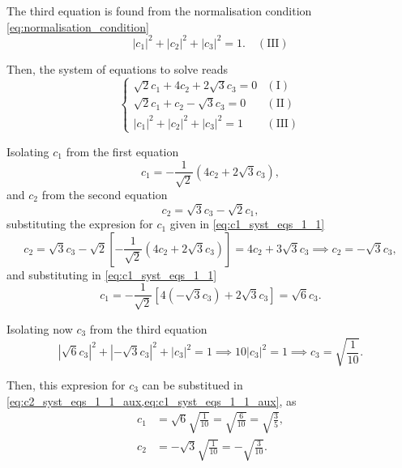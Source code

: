 The third equation is found from the normalisation condition \cref{eq:normalisation_condition} 
\begin{equation}
    \left| c_1 \right|^2 + \left| c_2 \right|^2 + \left| c_3 \right|^2 = 1.
    \quad \left( \mathrm{III} \right)
\end{equation}

Then, the system of equations to solve reads 
\begin{equation}
    \begin{cases}
        \sqrt{2} c_1 + 4 c_2 + 2\sqrt{3} c_3 = 0 & \left( \mathrm{I}   \right) \\
        \sqrt{2} c_1 + c_2 - \sqrt{3} c_3 = 0     & \left( \mathrm{II}  \right) \\
        \left| c_1 \right|^2 + \left| c_2 \right|^2 + \left| c_3 \right|^2 = 1      & \left( \mathrm{III} \right)   
    \end{cases}
\end{equation}

Isolating $c_1$ from the first equation 
\begin{equation}\label{eq:c1_syst_eqs_1_1}
    c_1 = -\frac{1}{\sqrt{2}} \left( 4c_2 + 2 \sqrt{3} c_3 \right),
\end{equation}
and $c_2$ from the second equation 
\begin{equation}
    c_2 = \sqrt{3} c_3 - \sqrt{2} c_1,
\end{equation}
substituting the expresion for $c_1$ given in \cref{eq:c1_syst_eqs_1_1}
\begin{equation}\label{eq:c2_syst_eqs_1_1_aux}
    c_2 
    = \sqrt{3} c_3 - \sqrt{2} \left[ -\frac{1}{\sqrt{2}} \left( 4c_2 + 2 \sqrt{3} c_3 \right) \right]
    = 4c_2 + 3\sqrt{3} c_3
    \implies
    c_2 = - \sqrt{3} c_3,
\end{equation}
and substituting in \cref{eq:c1_syst_eqs_1_1}
\begin{equation}\label{eq:c1_syst_eqs_1_1_aux}
    c_1 = -\frac{1}{\sqrt{2}} \left[ 4 \left( - \sqrt{3} c_3 \right) + 2 \sqrt{3} c_3 \right]
    = \sqrt{6} c_3.
\end{equation}

Isolating now $c_3$ from the third equation 
\begin{equation}
    \left| \sqrt{6} c_3 \right|^2 + \left| - \sqrt{3} c_3 \right|^2 + \left| c_3 \right|^2 = 1   
    \implies
    10 \left| c_3 \right|^2 = 1 
    \implies
    c_3 = \sqrt{\frac{1}{10}}.
\end{equation}

Then, this expresion for $c_3$ can be substitued in \cref{eq:c2_syst_eqs_1_1_aux,eq:c1_syst_eqs_1_1_aux}, as 
\begin{align}
    c_1 &= \sqrt{6} \sqrt{\frac{1}{10}} = \sqrt{\frac{6}{10}} = \sqrt{\frac{3}{5}}, \\
    c_2 &= - \sqrt{3} \sqrt{\frac{1}{10}} = -\sqrt{\frac{3}{10}}.
\end{align}

